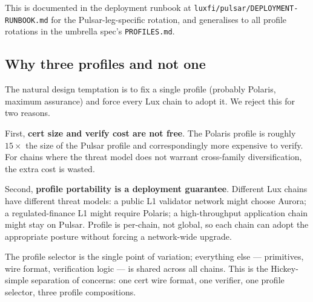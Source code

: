 This is documented in the deployment runbook at
\texttt{luxfi/pulsar/DEPLOYMENT-RUNBOOK.md} for the
Pulsar-leg-specific rotation, and generalises to all profile
rotations in the umbrella spec's \texttt{PROFILES.md}.

\subsection{Why three profiles and not one}

The natural design temptation is to fix a single profile (probably
Polaris, maximum assurance) and force every Lux chain to adopt it.
We reject this for two reasons.

First, \textbf{cert size and verify cost are not free}. The Polaris
profile is roughly $15\times$ the size of the Pulsar profile and
correspondingly more expensive to verify. For chains where the
threat model does not warrant cross-family diversification, the
extra cost is wasted.

Second, \textbf{profile portability is a deployment guarantee}.
Different Lux chains have different threat models: a public L1
validator network might choose Aurora; a regulated-finance L1
might require Polaris; a high-throughput application chain might
stay on Pulsar. Profile is per-chain, not global, so each chain can
adopt the appropriate posture without forcing a network-wide upgrade.

The profile selector is the single point of variation; everything
else --- primitives, wire format, verification logic --- is shared
across all chains. This is the Hickey-simple separation of concerns:
one cert wire format, one verifier, one profile selector, three
profile compositions.
